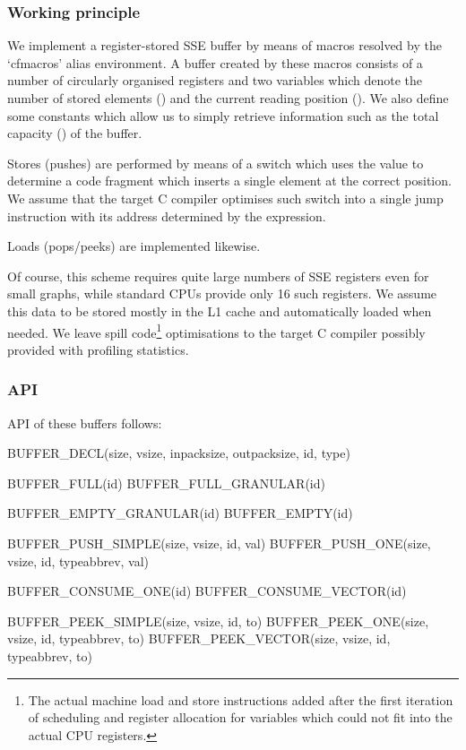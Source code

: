 \subsubsection{Working principle}

We implement a register-stored SSE buffer by means of macros resolved by the `cfmacros' alias environment. A buffer created by these macros consists of a number of circularly organised registers and two variables which denote the number of stored elements () and the current reading position (). We also define some constants which allow us to simply retrieve information such as the total capacity () of the buffer.

Stores (pushes) are performed by means of a switch which uses the value  to determine a code fragment which inserts a single element at the correct position. We assume that the target C compiler optimises such switch into a single jump instruction with its address determined by the expression.

Loads (pops/peeks) are implemented likewise. 

Of course, this scheme requires quite large numbers of SSE registers even for small graphs, while standard CPUs provide only 16 such registers. We assume this data to be stored mostly in the L1 cache and automatically loaded when needed. We leave spill code\footnote{The actual machine load and store instructions added after the first iteration of scheduling and register allocation for variables which could not fit into the actual CPU registers.} optimisations to the target C compiler possibly provided with profiling statistics.

\subsubsection{API}

API of these buffers follows:

\begin{code}
BUFFER_DECL(size, vsize, inpacksize, outpacksize, id, type)

BUFFER_FULL(id)
BUFFER_FULL_GRANULAR(id)

BUFFER_EMPTY_GRANULAR(id)
BUFFER_EMPTY(id)

BUFFER_PUSH_SIMPLE(size, vsize, id, val)
BUFFER_PUSH_ONE(size, vsize, id, typeabbrev, val)

BUFFER_CONSUME_ONE(id)
BUFFER_CONSUME_VECTOR(id)

BUFFER_PEEK_SIMPLE(size, vsize, id, to)
BUFFER_PEEK_ONE(size, vsize, id, typeabbrev, to)
BUFFER_PEEK_VECTOR(size, vsize, id, typeabbrev, to)
\end{code}

